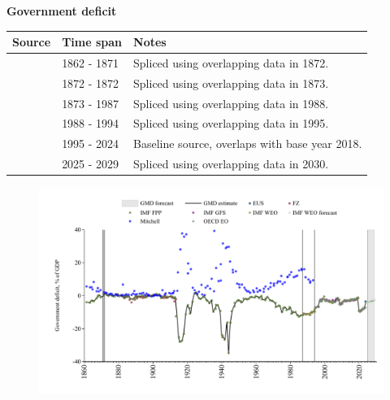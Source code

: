 \documentclass[12pt,a4paper,landscape]{article}
\begin{document}
\begin{adjustbox}{max totalsize={\paperwidth}{\paperheight},center}
\begin{minipage}[t][\textheight][t]{\textwidth}
\vspace*{0.5cm}
{}
\begin{center}
{\Large\bfseries Government deficit}
\end{center}
\vspace{0.5cm}
\begin{table}[H]
\centering
\small
\begin{tabular}{|l|l|l|}
\hline
\textbf{Source} & \textbf{Time span} & \textbf{Notes} \\
\hline
\rowcolor{white}\cite{IMF_FPP}& 1862 - 1871 &Spliced using overlapping data in 1872. \\
\rowcolor{lightgray}\cite{Mitchell}& 1872 - 1872 &Spliced using overlapping data in 1873. \\
\rowcolor{white}\cite{IMF_FPP}& 1873 - 1987 &Spliced using overlapping data in 1988. \\
\rowcolor{lightgray}\cite{IMF_WEO}& 1988 - 1994 &Spliced using overlapping data in 1995. \\
\rowcolor{white}\cite{EUS}& 1995 - 2024 &Baseline source, overlaps with base year 2018. \\
\rowcolor{lightgray}\cite{IMF_WEO_forecast}& 2025 - 2029 &Spliced using overlapping data in 2030. \\
\hline
\end{tabular}
\end{table}
\begin{figure}[H]
\centering
\includegraphics[width=\textwidth,height=0.6\textheight,keepaspectratio]{graphs/ITA_govdef_GDP.pdf}
\end{figure}
\end{minipage}
\end{adjustbox}
\end{document}
